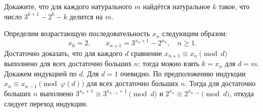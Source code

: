 Докажите, что для каждого натурального $m$ найдётся натуральное $k$ такое, что
число $3^{k+1} - 2^k - k$ делится на $m$.


\solution
Определим возрастающую последовательность $x_n$ следующим образом:
\[
    x_0 = 2
,\qquad
    x_{n+1} = 3^{x_n + 1} - 2^{x_n}
,\quad
    n \geq 1
.\]
Достаточно доказать, что для каждого $d$ сравнение
$x_{n+1} \equiv x_n \pmod{d}$ выполнено для всех достаточно больших $n$:
тогда можно взять $k = x_n$ для $d = m$.
Докажем индукцией по $d$.
Для $d = 1$ очевидно.
По предположению индукции
$x_n \equiv x_{n-1} \pmod{\varphi(d)}$
для всех достаточно больших $n$.
Тогда для достаточно больших $n$ выполнено
$3^{x_n + 1} \equiv 3^{x_{n-1} + 1} \pmod d$ и
$2^{x_n} \equiv 2^{x_{n-1}} \pmod d$,
откуда следует переход индукции.


